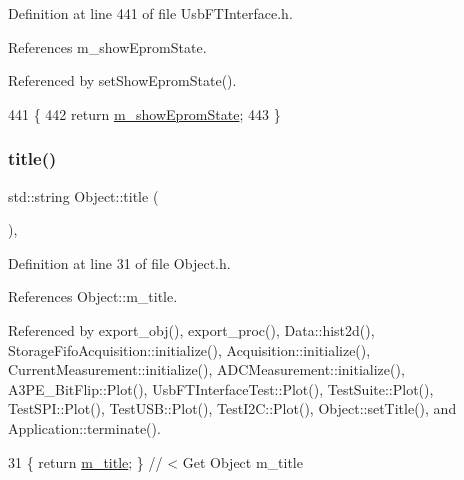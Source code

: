 Definition at line 441 of file Usb\+F\+T\+Interface.\+h.



References m\+\_\+show\+Eprom\+State.



Referenced by set\+Show\+Eprom\+State().


\begin{DoxyCode}
441                          \{
442     \textcolor{keywordflow}{return} \hyperlink{classUsbFTInterface_aa5c215777af41de94a2b371c59c88c7c}{m\_showEpromState};
443   \}  
\end{DoxyCode}
\mbox{\label{classObject_a73a0f1a41828fdd8303dd662446fb6c3}} 
\subsubsection{\texorpdfstring{title()}{title()}}
{\footnotesize\ttfamily std\+::string Object\+::title (\begin{DoxyParamCaption}{ }\end{DoxyParamCaption})\hspace{0.3cm}{\ttfamily [inline]}, {\ttfamily [inherited]}}



Definition at line 31 of file Object.\+h.



References Object\+::m\+\_\+title.



Referenced by export\+\_\+obj(), export\+\_\+proc(), Data\+::hist2d(), Storage\+Fifo\+Acquisition\+::initialize(), Acquisition\+::initialize(), Current\+Measurement\+::initialize(), A\+D\+C\+Measurement\+::initialize(), A3\+P\+E\+\_\+\+Bit\+Flip\+::\+Plot(), Usb\+F\+T\+Interface\+Test\+::\+Plot(), Test\+Suite\+::\+Plot(), Test\+S\+P\+I\+::\+Plot(), Test\+U\+S\+B\+::\+Plot(), Test\+I2\+C\+::\+Plot(), Object\+::set\+Title(), and Application\+::terminate().


\begin{DoxyCode}
31 \{ \textcolor{keywordflow}{return} \hyperlink{classObject_affbeea1953eb5163573b92fad8f75727}{m\_title};      \} \textcolor{comment}{// < Get Object m\_title}
\end{DoxyCode}
\mbox{\label{classHierarchy_a76e914b9a677a22a82deb74d892bf261}} 
